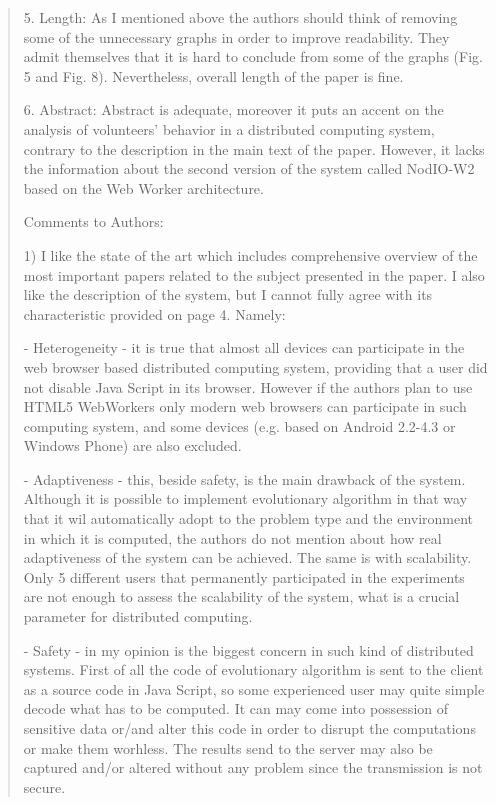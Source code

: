 \documentclass[preprint]{elsarticle}
\begin{document}
\begin{quote}

5. Length: As I mentioned above the authors should think of removing some of the unnecessary graphs
in order to improve readability. They admit themselves that it is hard to conclude from some of the
graphs (Fig. 5 and Fig. 8). Nevertheless, overall length of the paper is fine.

6. Abstract: Abstract is adequate, moreover it puts an accent on the analysis of volunteers' behavior in a
distributed computing system, contrary to the description in the main text of the paper. However, it
lacks the information about the second version of the system called NodIO-W2 based on the Web
Worker architecture.

Comments to Authors:

1) I like the state of the art which includes comprehensive overview of the most important papers related
to the subject presented in the paper. I also like the description of the system, but I cannot fully agree
with its characteristic provided on page 4. Namely:
 
 - Heterogeneity - it is true that almost all devices can participate in the web browser based
 distributed computing system, providing that a user did not disable Java Script in its browser.
 However if the authors plan to use HTML5 WebWorkers only modern web browsers can
 participate in such computing system, and some devices (e.g. based on Android 2.2-4.3 or
 Windows Phone) are also excluded.
 
 - Adaptiveness - this, beside safety, is the main drawback of the system. Although it is possible to
 implement evolutionary algorithm in that way that it wil automatically adopt to the problem type
 and the environment in which it is computed, the authors do not mention about how real
 adaptiveness of the system can be achieved. The same is with scalability. Only 5 different users
 that permanently participated in the experiments are not enough to assess the scalability of the
 system, what is a crucial parameter for distributed computing.
 
 - Safety - in my opinion is the biggest concern in such kind of distributed systems. First of all the
 code of evolutionary algorithm is sent to the client as a source code in Java Script, so some
 experienced user may quite simple decode what has to be computed. It can may come into
 possession of sensitive data or/and alter this code in order to disrupt the computations or make
 them worhless. The results send to the server may also be captured and/or altered without any
 problem since the transmission is not secure.


\end{quote}
\end{document}
